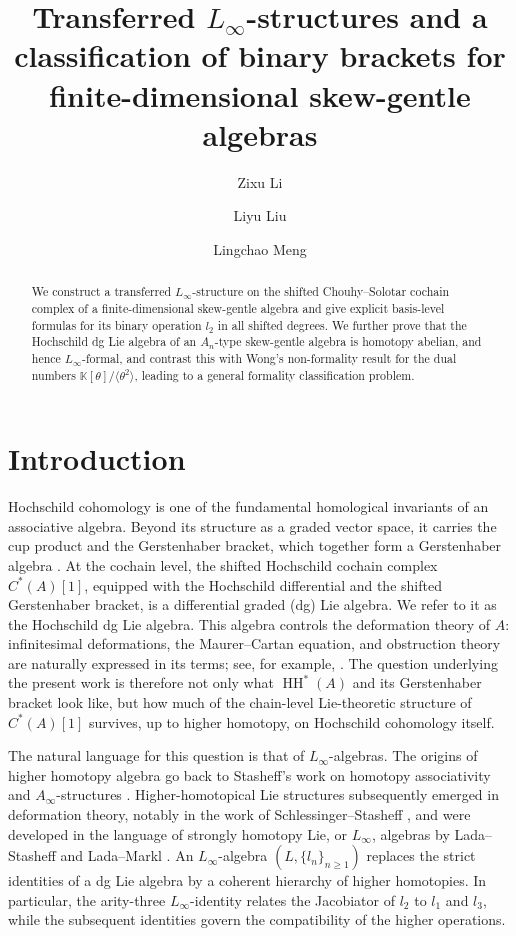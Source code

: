 \documentclass[11pt,a4paper,reqno]{amsart}
\title[Transferred $L_\infty$-structures and binary brackets]
{Transferred $L_\infty$-structures and a classification of binary brackets for finite-dimensional skew-gentle algebras}
\author{Zixu Li}
\author{Liyu Liu}
\author{Lingchao Meng}
\date{}
\newcommand{\mK}{\mathbb K}
\newcommand{\HH}{\operatorname{HH}}
\theoremstyle{plain}
\theoremstyle{definition}
\numberwithin{equation}{section}
\begin{document}
	
	\begin{abstract}
		We construct a transferred $L_\infty$-structure on the shifted Chouhy--Solotar cochain complex of a finite-dimensional skew-gentle algebra and give explicit basis-level formulas for its binary operation $l_2$ in all shifted degrees. We further prove that the Hochschild dg Lie algebra of an $A_n$-type skew-gentle algebra is homotopy abelian, and hence $L_\infty$-formal, and contrast this with Wong's non-formality result for the dual numbers $\mK[\theta]/\langle \theta^2 \rangle$, leading to a general formality classification problem.
	\end{abstract}
	
	\maketitle
	\tableofcontents
	\bigskip
	
	\section{Introduction}
	
	Hochschild cohomology is one of the fundamental homological invariants of an
	associative algebra.  Beyond its structure as a graded vector space, it
	carries the cup product and the Gerstenhaber bracket, which together form a
	Gerstenhaber algebra \cite{Ger63}.  At the cochain level, the shifted Hochschild cochain complex
	$C^*(A)[1]$, equipped with the Hochschild differential and the shifted
	Gerstenhaber bracket, is a differential graded (dg) Lie algebra.  We refer to it as the Hochschild dg Lie algebra.  This algebra controls the deformation
	theory of $A$: infinitesimal deformations, the Maurer--Cartan equation, and
	obstruction theory are naturally expressed in its terms; see, for example,
	\cite{Ger63,Wit19}.  The question underlying the present work is therefore
	not only what $\HH^*(A)$ and its Gerstenhaber bracket look like, but how much
	of the chain-level Lie-theoretic structure of $C^*(A)[1]$ survives, up to
	higher homotopy, on Hochschild cohomology itself.
	
	The natural language for this question is that of $L_\infty$-algebras.  The
	origins of higher homotopy algebra go back to Stasheff's work on homotopy
	associativity and $A_\infty$-structures \cite{Sta63}.  Higher-homotopical Lie
	structures subsequently emerged in deformation theory, notably in the work
	of Schlessinger--Stasheff \cite{SS85}, and were developed in the language of
	strongly homotopy Lie, or $L_\infty$, algebras by Lada--Stasheff and
	Lada--Markl \cite{LS93,LM95}.  An $L_\infty$-algebra
	$(L,\{l_n\}_{n\geq1})$ replaces the strict identities of a dg Lie algebra
	by a coherent hierarchy of higher homotopies.  In particular, the
	arity-three $L_\infty$-identity relates the Jacobiator of $l_2$ to $l_1$ and
	$l_3$, while the subsequent identities govern the compatibility of the
	higher operations.
	
\end{document}
